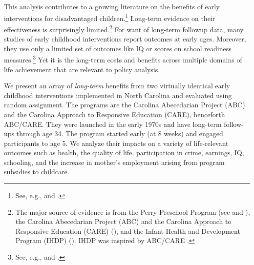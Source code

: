 This analysis contributes to a growing literature on the benefits of early interventions for disadvantaged children.\footnote{See, e.g., \cite{Currie_2011_AER} and \cite{Elango_Hojman_etal_2016_Early-Edu}.} Long-term evidence on their effectiveness is surprisingly limited.\footnote{The major source of evidence is from the Perry Preschool Program (see \citealp{Schweinhart_Montie_ea_2005_BOOKlifetime} and \citealp{Heckman_Moon_etal_2010_RateofReturn,Heckman_Moon_etal_2010_QE}), the Carolina Abecedarian Project (ABC) and the Carolina Approach to Responsive Education (CARE) (\citealp{Ramey_Campbell_etal_2000_ADS,Ramey-etal_2012-ABC}), and the Infant Health and Development Program (IHDP) (\citealp{Gross_Spiker_etal_1997_BOOKHelpinglowbirth,Duncan_Sojourner_2013_JHR}). IHDP was inspired by ABC/CARE \citep[][]{Gross_Spiker_etal_1997_BOOKHelpinglowbirth}.} For want of long-term followup data, many studies of early childhood interventions report outcomes at early ages. Moreover, they use only a limited set of outcomes like IQ or scores on school readiness measures.\footnote{See, e.g., \cite{Kline_Walters_2014_EvaluatingPublicPrograms} and \cite{Weiland_2013_CD_Impacts-of-Pre-K}.} Yet it is the long-term costs and benefits across multiple domains of life achievement that are relevant to policy analysis.

We present an array of \emph{long-term} benefits from two virtually identical early childhood interventions implemented in North Carolina and evaluated using random assignment. The programs are the Carolina Abecedarian Project (ABC) and the Carolina Approach to Responsive Education (CARE), henceforth ABC/CARE. They were launched in the early 1970s and have long-term follow-ups through age 34. The program started early (at 8 weeks) and engaged participants to age 5. We analyze their impacts on a variety of life-relevant outcomes such as health, the quality of life, participation in crime, earnings, IQ, schooling, and the increase in mother's employment arising from program subsidies to childcare.

